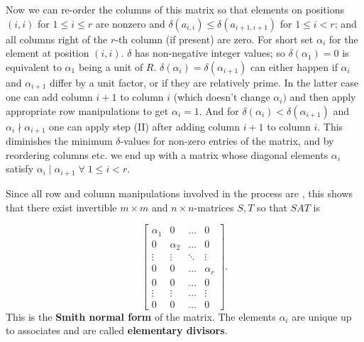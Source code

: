 \documentclass[12pt]{article}
\begin{document}
Now we can re-order the columns of this matrix so that elements on positions
$(i,i)$ for $1 \le i\le r$ are nonzero and $\delta(a_{i,i}) \le
\delta(a_{i+1,i+1})$ for $1 \le i < r$; and all columns right of the $r$-th
column (if present) are zero. For short set $\alpha_i$ for the element at
position $(i,i)$. $\delta$ has non-negative integer values; so
$\delta(\alpha_1)=0$ is equivalent to $\alpha_1$ being a unit of $R$.
$\delta(\alpha_i) =\delta(\alpha_{i+1})$ can either happen if $\alpha_i$ and
$\alpha_{i+1}$ differ by a unit factor, or if they are relatively prime. In the
latter case one can add column $i+1$ to column $i$ (which doesn't change
$\alpha_i)$ and then apply appropriate row manipulations to get $\alpha_i=1$.
And for $\delta(\alpha_i)<\delta(\alpha_{i+1})$ and $\alpha_i \nmid
\alpha_{i+1}$ one can apply step (II) after adding column $i+1$ to column $i$.
This diminishes the minimum $\delta$-values for non-zero entries of the matrix,
and by reordering columns etc. we end up with a matrix whose diagonal elements
$\alpha_i$ satisfy $\alpha_i \mid \alpha_{i+1}\;\forall\;1 \le i < r$.

Since all row and column manipulations involved in the process are ,
this shows that there exist invertible $m \times m$ and $n \times n$-matrices
$S,T$ so that $SAT$ is

$$\left[\begin{matrix}
\alpha_1 & 0 & \ldots & 0 \\
0 & \alpha_2 &  \ldots & 0 \\
\vdots &\vdots & \ddots & \vdots\\
0 & 0 & \ldots & \alpha_r  \\
0 & 0 & \ldots & 0 \\
\vdots & \vdots & \ldots & \vdots \\
0 & 0 & \ldots & 0 
\end{matrix}\right].$$
This is the \textbf{Smith normal form} of the matrix. The elements $\alpha_i$ are unique up to associates and are called
\textbf{elementary divisors}.
\end{document}
